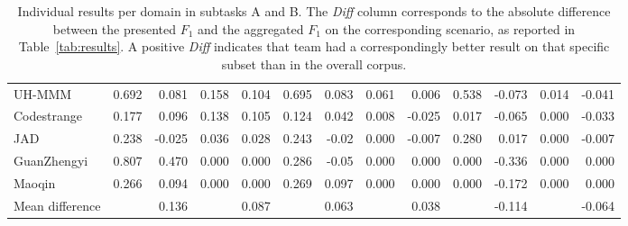 \documentclass[a4paper,11pt,twocolumn,twoside]{article}
\begin{document}
\begin{table}[htb]
{\begin{tabular}{l|rrrr|rrrr|rrrr}
      UH-MMM           & 0.692                                 & 0.081                                  & 0.158                               & 0.104                                & 0.695                               & 0.083                               & 0.061     & 0.006         & 0.538     & -0.073        & 0.014     & -0.041        \\
      Codestrange      & 0.177                                 & 0.096                                  & 0.138                               & 0.105                                & 0.124                               & 0.042                               & 0.008     & -0.025        & 0.017     & -0.065        & 0.000     & -0.033        \\
      JAD              & 0.238                                 & -0.025                                 & 0.036                               & 0.028                                & 0.243                               & -0.02                               & 0.000     & -0.007        & 0.280     & 0.017         & 0.000     & -0.007        \\
      GuanZhengyi      & 0.807                                 & 0.470                                  & 0.000                               & 0.000                                & 0.286                               & -0.05                               & 0.000     & 0.000         & 0.000     & -0.336        & 0.000     & 0.000         \\
      Maoqin           & 0.266                                 & 0.094                                  & 0.000                               & 0.000                                & 0.269                               & 0.097                               & 0.000     & 0.000         & 0.000     & -0.172        & 0.000     & 0.000         \\
      \midrule
      Mean difference  &                                       & 0.136                                  &                                     & 0.087                                &                                     & 0.063                               &           & 0.038         &           & -0.114        &           & -0.064        \\
      \bottomrule
    \end{tabular}}
  \caption{Individual results per domain in subtasks A and B. The \textit{Diff} column corresponds to the absolute difference between the presented $F_1$ and the aggregated $F_1$ on the corresponding scenario,
    as reported in Table~\ref{tab:results}. A positive \textit{Diff} indicates that team had a correspondingly better result on that specific subset than in the overall corpus.\label{tab:models}}
\end{table}
\end{document}

